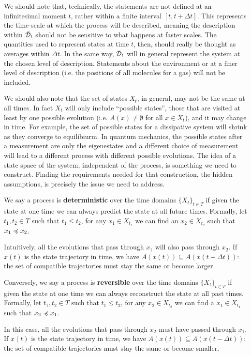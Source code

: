 \documentclass[letterpaper]{article}
\begin{document}
We should note that, technically, the statements are not defined at an infinitesimal moment $t$, rather within a finite interval $[t, t + \Delta t]$. This represents the time-scale at which the process will be described, meaning the description within $\bar{\mathcal{D}}_t$ should not be sensitive to what happens at faster scales. The quantities used to represent states at time $t$, then, should really be thought as averages within $\Delta t$. In the same way, $\bar{\mathcal{D}}_t$ will in general represent the system at the chosen level of description. Statements about the environment or at a finer level of description (i.e. the positions of all molecules for a gas) will not be included.

We should also note that the set of states $X_t$, in general, may not be the same at all times. In fact $X_t$ will only include ``possible states'', those that are visited at least by one possible evolution (i.e. $A(x) \neq \emptyset$ for all $x \in X_t$), and it may change in time. For example, the set of possible states for a dissipative system will shrink as they converge to equilibiurm. In quantum mechanics, the possible states after a measurement are only the eigenestates and a different choice of measurement will lead to a different process with different possible evolutions. The idea of a state space of the system, independent of the process, is something we need to construct. Finding the requirements needed for that construction, the hidden assumptions, is precisely the issue we need to address.

We say a process is \textbf{deterministic} over the time domains $\{X_t\}_{t \in T}$ if given the state at one time we can always predict the state at all future times. Formally, let $t_1, t_2 \in T$ such that $t_1 \leq t_2$, for any $x_1 \in X_{t_1}$ we can find an $x_2 \in X_{t_2}$ such that $x_1 \preccurlyeq x_2$.

Intuitively, all the evolutions that pass through $x_1$ will also pass through $x_2$. If $x(t)$ is the state trajectory in time, we have $A(x(t)) \subseteq A(x(t + \Delta t))$: the set of compatible trajectories must stay the same or become larger.

Conversely, we say a process is \textbf{reversible} over the time domains $\{X_t\}_{t \in T}$ if given the state at one time we can always reconstruct the state at all past times. Formally, let $t_1, t_2 \in T$ such that $t_1 \leq t_2$, for any $x_2 \in X_{t_2}$ we can find a $x_1 \in X_{t_1}$ such that $x_2 \preccurlyeq x_1$.

In this case, all the evolutions that pass through $x_2$ must have passed through $x_1$. If $x(t)$ is the state trajectory in time, we have $A(x(t)) \subseteq A(x(t - \Delta t))$: the set of compatible trajectories must stay the same or become smaller.
\end{document}
